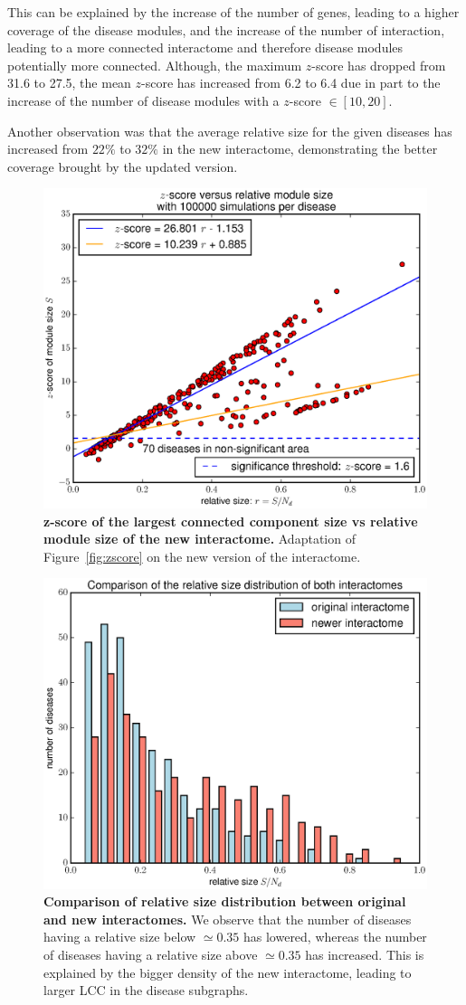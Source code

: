 \documentclass[letterpaper]{article}
\begin{document}
	This can be explained by the increase of the number of genes, leading to a higher coverage of the disease
	modules, and the increase of the number of interaction, leading to a more connected interactome and
	therefore disease modules potentially more connected. Although, the maximum $z$-score has dropped from
	31.6 to 27.5, the mean $z$-score has increased from 6.2 to 6.4 due in part to the increase of the number
	of disease modules with a $z$-score $\in [10, 20]$.

	Another observation was that the average relative size for the given diseases has increased from $22\%$
	to $32\%$ in the new interactome, demonstrating the better coverage brought by the updated version.

	\begin{figure}[!h]
		\hspace{-.6cm}
		\includegraphics[width=.55\textwidth]{images/new_interactome_S4.b100000.eps}
		\vspace{-.7cm}
		\caption{{\bf z-score of the largest connected component size vs relative module size of the new interactome.}
		Adaptation of Figure~\ref{fig:zscore} on the new version of the interactome.
		\label{fig:new interactome zscore}}
	\end{figure}

	\begin{figure}[!h]
		\hspace{-.6cm}
		\includegraphics[width=.55\textwidth]{images/rel_sizes_comparison.eps}
		\vspace{-.5cm}
		\caption{{\bf Comparison of relative size distribution between original and new interactomes.}
		We observe that the number of diseases having a relative size below $\simeq 0.35$ has lowered, whereas the number
		of diseases having a relative size above $\simeq 0.35$ has increased. This is explained by the bigger density of
		the new interactome, leading to larger LCC in the disease subgraphs.
		\label{fig:rel sizes comparison}}
	\end{figure}
\end{document}
